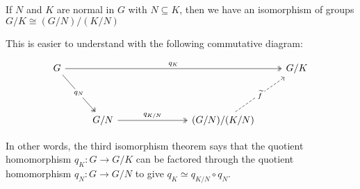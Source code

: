 \begin{theorem} 
If $N$ and $K$ are normal in $G$ with $N \subseteq K$, then we have an isomorphism of groups $G/K \cong (G/N)/(K/N)$
  \label{thm:tit}
\end{theorem}

This is easier to understand with the following commutative diagram:

\[\begin{tikzcd}
	{G} &&&&& {G/K} \\
	\\
	& {G/N} &&& {(G/N)/(K/N)}
	\arrow["{q_K}", two heads, from=1-1, to=1-6]
	\arrow["{q_{K/N}}", two heads, from=3-2, to=3-5]
	\arrow["{q_N}"{description}, two heads, from=1-1, to=3-2]
	\arrow["{\widetilde{f}}"{description}, dashed, from=3-5, to=1-6]
\end{tikzcd}\]

\begin{remark}
    In other words, the third isomorphism theorem says that the quotient homomorphism $q_K : G \rightarrow G/K$ can be factored through the quotient homomorphism $q_N : G \rightarrow G/N$ to give $q_K \simeq q_{K/N} \circ q_N$.
\end{remark}


